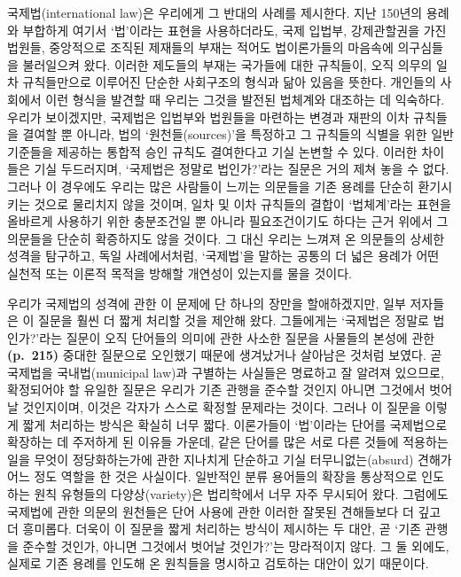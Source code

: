 국제법(international law)은 우리에게 그 반대의 사례를 제시한다. 지난
150년의 용례와 부합하게 여기서 ‘법’이라는 표현을 사용하더라도, 국제
입법부, 강제관할권을 가진 법원들, 중앙적으로 조직된 제재들의 부재는
적어도 법이론가들의 마음속에 의구심들을 불러일으켜 왔다. 이러한 제도들의
부재는 국가들에 대한 규칙들이, 오직 의무의 일차 규칙들만으로 이루어진
단순한 사회구조의 형식과 닮아 있음을 뜻한다. 개인들의 사회에서 이런
형식을 발견할 때 우리는 그것을 발전된 법체계와 대조하는 데 익숙하다.
우리가 보이겠지만, 국제법은 입법부와 법원들을 마련하는 변경과 재판의
이차 규칙들을 결여할 뿐 아니라, 법의 ‘원천들(sources)’을 특정하고 그
규칙들의 식별을 위한 일반 기준들을 제공하는 통합적 승인 규칙도
결여한다고 기실 논변할 수 있다. 이러한 차이들은 기실 두드러지며,
‘국제법은 정말로 법인가?’라는 질문은 거의 제쳐 놓을 수 없다. 그러나 이
경우에도 우리는 많은 사람들이 느끼는 의문들을 기존 용례를 단순히
환기시키는 것으로 물리치지 않을 것이며, 일차 및 이차 규칙들의 결합이
‘법체계’라는 표현을 올바르게 사용하기 위한 충분조건일 뿐 아니라
필요조건이기도 하다는 근거 위에서 그 의문들을 단순히 확증하지도 않을
것이다. 그 대신 우리는 느껴져 온 의문들의 상세한 성격을 탐구하고, 독일
사례에서처럼, ‘국제법’을 말하는 공통의 더 넓은 용례가 어떤 실천적 또는
이론적 목적을 방해할 개연성이 있는지를 물을 것이다.

우리가 국제법의 성격에 관한 이 문제에 단 하나의 장만을 할애하겠지만,
일부 저자들은 이 질문을 훨씬 더 짧게 처리할 것을 제안해 왔다. 그들에게는
‘국제법은 정말로 법인가?’라는 질문이 오직 단어들의 의미에 관한 사소한
질문을 사물들의 본성에 관한 \textbf{(p.~215)} 중대한 질문으로 오인했기
때문에 생겨났거나 살아남은 것처럼 보였다. 곧 국제법을 국내법(municipal
law)과 구별하는 사실들은 명료하고 잘 알려져 있으므로, 확정되어야 할
유일한 질문은 우리가 기존 관행을 준수할 것인지 아니면 그것에서 벗어날
것인지이며, 이것은 각자가 스스로 확정할 문제라는 것이다. 그러나 이
질문을 이렇게 짧게 처리하는 방식은 확실히 너무 짧다. 이론가들이
‘법’이라는 단어를 국제법으로 확장하는 데 주저하게 된 이유들 가운데, 같은
단어를 많은 서로 다른 것들에 적용하는 일을 무엇이 정당화하는가에 관한
지나치게 단순하고 기실 터무니없는(absurd) 견해가 어느 정도 역할을 한
것은 사실이다. 일반적인 분류 용어들의 확장을 통상적으로 인도하는 원칙
유형들의 다양상(variety)은 법리학에서 너무 자주 무시되어 왔다. 그럼에도
국제법에 관한 의문의 원천들은 단어 사용에 관한 이러한 잘못된 견해들보다
더 깊고 더 흥미롭다. 더욱이 이 질문을 짧게 처리하는 방식이 제시하는 두
대안, 곧 ‘기존 관행을 준수할 것인가, 아니면 그것에서 벗어날 것인가?’는
망라적이지 않다. 그 둘 외에도, 실제로 기존 용례를 인도해 온 원칙들을
명시하고 검토하는 대안이 있기 때문이다.


